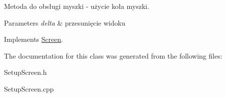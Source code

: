 Metoda do obsługi myszki -\/ użycie koła myszki. 


\begin{DoxyParams}{Parameters}
{\em delta} & przesunięcie widoku \\
\hline
\end{DoxyParams}


Implements \mbox{\hyperlink{class_screen_a039b9d63b0afafff7af22c26e2d81f5e}{Screen}}.



The documentation for this class was generated from the following files\+:\begin{DoxyCompactItemize}
\item 
Setup\+Screen.\+h\item 
Setup\+Screen.\+cpp\end{DoxyCompactItemize}
